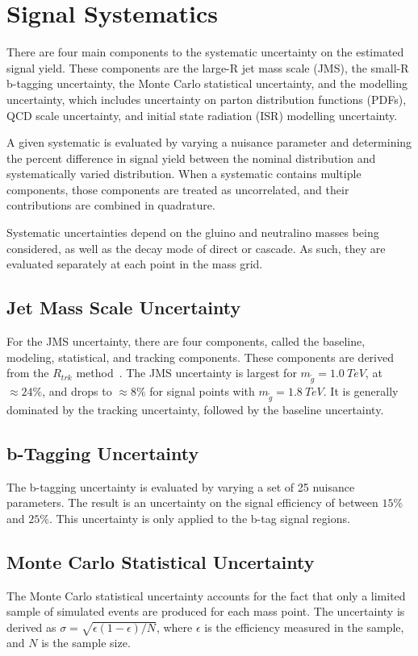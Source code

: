\chapter{Signal Systematics}\label{ch:signal_systematics}
There are four main components to the systematic uncertainty on the
estimated signal yield.
These components are the large-R jet mass scale (JMS), the small-R b-tagging uncertainty, the Monte Carlo statistical
uncertainty, and the modelling uncertainty, which includes uncertainty
on parton distribution functions (PDFs), QCD scale uncertainty, and
initial state radiation (ISR) modelling uncertainty.

A given systematic is evaluated by varying a nuisance parameter and
determining the percent difference in signal yield between the nominal
distribution and systematically varied distribution.
When a systematic contains multiple components, those components are treated as
uncorrelated, and their contributions are combined in quadrature.

Systematic uncertainties depend on the gluino and neutralino masses
being considered, as well as the decay mode of direct or cascade.
As such, they are evaluated separately at each point in the mass grid.

\section{Jet Mass Scale Uncertainty}\label{sec:signal_jms_uncertainty}
For the JMS uncertainty, there are four components, called the
baseline, modeling, statistical, and tracking components.
These components are derived from the $R_{trk}$ method~\cite{jet-substructure-perf}.
The JMS uncertainty is largest for $m_{\tilde{g}}=1.0~TeV$, at $\approx 24\%$, and drops to $\approx 8\%$
for signal points with $m_{\tilde{g}}=1.8~TeV$.
It is generally dominated by the tracking uncertainty, followed by the baseline uncertainty.

\section{b-Tagging Uncertainty}\label{sec:signal_btag_uncertainty}
The b-tagging uncertainty is evaluated by varying a set of 25 nuisance parameters.
The result is an uncertainty on the signal efficiency of between $15\%$ and $25\%$.
This uncertainty is only applied to the b-tag signal regions.

\section{Monte Carlo Statistical Uncertainty}\label{sec:signal_mc_uncertainty}
The Monte Carlo statistical uncertainty accounts for the fact that only a limited sample of simulated events are
produced for each mass point.
The uncertainty is derived as $\sigma=\sqrt{\epsilon(1-\epsilon)/N}$, where $\epsilon$ is the
efficiency measured in the sample, and $N$ is the sample size.


